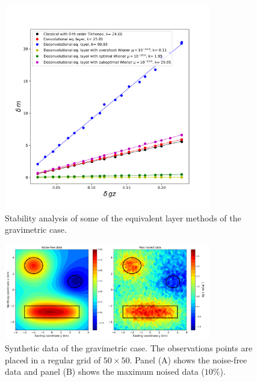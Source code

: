 
\begin{figure}[htbp]
	\begin{center}
		\includegraphics[width=9cm]{Fig/stability_grav}
	\end{center}
	\caption{Stability analysis of some of the equivalent layer methods of the gravimetric case.}
	\label{fig:3}
\end{figure}

\begin{figure}[htbp]
	\begin{center}
		\includegraphics[width=9cm]{Fig/synthetic_grav}
	\end{center}
	\caption{Synthetic data of the gravimetric case. The observations points are placed in a regular grid of $50 \times 50$. Panel (A) shows the noise-free data and panel (B) shows the maximum noised data ($10\%$).}
	\label{fig:4}
\end{figure}

